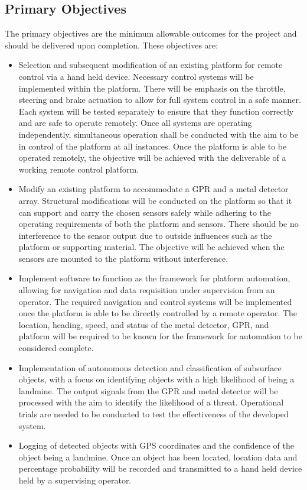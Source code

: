 \documentclass[main.tex]{subfiles}
\begin{document}
\subsection{Primary Objectives}
The primary objectives are the minimum allowable outcomes for the project and should be delivered upon completion. These objectives are:
\begin{itemize}
\item Selection and subsequent modification of an existing platform for remote control via a hand held device. Necessary control systems will be implemented within the platform. There will be emphasis on the throttle, steering and brake actuation to allow for full system control in a safe manner. Each system will be tested separately to ensure that they function correctly and are safe to operate remotely. Once all systems are operating independently, simultaneous operation shall be conducted with the aim to be in control of the platform at all instances. Once the platform is able to be operated remotely, the objective will be achieved with the deliverable of a working remote control platform.

\item Modify an existing platform to accommodate a GPR and a metal detector array. Structural modifications will be conducted on the platform so that it can support and carry the chosen sensors safely while adhering to the operating requirements of both the platform and sensors. There should be no interference to the sensor output due to outside influences such as the platform or supporting material. The objective will be achieved when the sensors are mounted to the platform without interference.

\item Implement software to function as the framework for platform automation, allowing for navigation and data requisition under supervision from an operator. The required navigation and control systems will be implemented once the platform is able to be directly controlled by a remote operator. The location, heading, speed, and status of the metal detector, GPR, and platform will be required to be known for the framework for automation to be considered complete.

\item Implementation of autonomous detection and classification of subsurface objects, with a focus on identifying objects with a high likelihood of being a landmine. The output signals from the GPR and metal detector will be processed with the aim to identify the likelihood of a threat. Operational trials are needed to be conducted to test the effectiveness of the developed system. 

\item Logging of detected objects with GPS coordinates and the confidence of the object being a landmine. Once an object has been located, location data and percentage probability will be recorded and transmitted to a hand held device held by a supervising operator.
\end{itemize}
\end{document}
